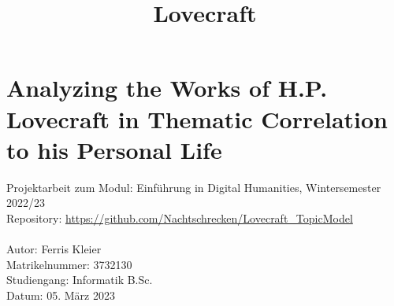 \documentclass[11pt]{article}
\title{Lovecraft}
\begin{document}
    \section*{Analyzing the Works of H.P. Lovecraft in Thematic Correlation to his Personal Life}
    Projektarbeit zum Modul: Einführung in Digital Humanities, Wintersemester 2022/23\\
    Repository: \href{https://github.com/Nachtschrecken/Lovecraft_TopicModel}{https://github.com/Nachtschrecken/Lovecraft\_TopicModel}\\\\
    Autor: Ferris Kleier\\
    Matrikelnummer: 3732130\\
    Studiengang: Informatik B.Sc.\\
    Datum: 05. März 2023

    
    
    
    
    
    
    
    
    
\end{document}
